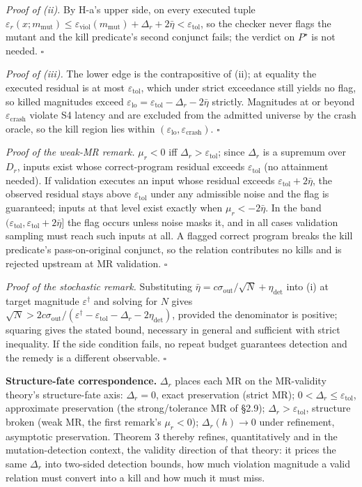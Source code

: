 \documentclass[manuscript,screen,review]{acmart}
\begin{document}
\emph{Proof of (ii).} By H-a's upper side, on every executed tuple
$\varepsilon_r(x;m_{\mathrm{mut}})\le\varepsilon_{\mathrm{viol}}(m_{\mathrm{mut}})+\Delta_r+2\bar\eta<\varepsilon_{\mathrm{tol}}$,
so the checker never flags the mutant and the kill predicate's second
conjunct fails; the verdict on $P^\star$ is not needed. $\square$

\emph{Proof of (iii).} The lower edge is the contrapositive of (ii); at
equality the executed residual is at most $\varepsilon_{\mathrm{tol}}$,
which under strict exceedance still yields no flag, so killed magnitudes
exceed $\varepsilon_{\mathrm{lo}}=\varepsilon_{\mathrm{tol}}-\Delta_r-2\bar\eta$
strictly. Magnitudes at or beyond $\varepsilon_{\mathrm{crash}}$ violate
S4 latency and are excluded from the admitted universe by the crash
oracle, so the kill region lies within
$(\varepsilon_{\mathrm{lo}},\varepsilon_{\mathrm{crash}})$. $\square$

\emph{Proof of the weak-MR remark.} $\mu_r<0$ iff
$\Delta_r>\varepsilon_{\mathrm{tol}}$; since $\Delta_r$ is a supremum
over $D_r$, inputs exist whose correct-program residual exceeds
$\varepsilon_{\mathrm{tol}}$ (no attainment needed). If validation
executes an input whose residual exceeds
$\varepsilon_{\mathrm{tol}}+2\bar\eta$, the observed residual stays
above $\varepsilon_{\mathrm{tol}}$ under any admissible noise and the
flag is guaranteed; inputs at that level exist exactly when
$\mu_r<-2\bar\eta$. In the band
$(\varepsilon_{\mathrm{tol}},\varepsilon_{\mathrm{tol}}+2\bar\eta]$ the
flag occurs unless noise masks it, and in all cases validation sampling
must reach such inputs at all. A flagged correct program breaks the kill predicate's
pass-on-original conjunct, so the relation contributes no kills and is
rejected upstream at MR validation. $\square$

\emph{Proof of the stochastic remark.} Substituting
$\bar\eta=c\sigma_{\mathrm{out}}/\sqrt N+\eta_{\mathrm{det}}$ into (i)
at target magnitude $\varepsilon^\dagger$ and solving for $N$ gives
$\sqrt N>2c\sigma_{\mathrm{out}}/(\varepsilon^\dagger-\varepsilon_{\mathrm{tol}}-\Delta_r-2\eta_{\mathrm{det}})$,
provided the denominator is positive; squaring gives the stated bound,
necessary in general and sufficient with strict inequality. If the side
condition fails, no repeat budget guarantees detection and the remedy is
a different observable. $\square$

\textbf{Structure-fate correspondence.} $\Delta_r$ places each MR on the
MR-validity theory's structure-fate axis: $\Delta_r=0$, exact
preservation (strict MR); $0<\Delta_r\le\varepsilon_{\mathrm{tol}}$,
approximate preservation (the strong/tolerance MR of §2.9);
$\Delta_r>\varepsilon_{\mathrm{tol}}$, structure broken (weak MR, the
first remark's $\mu_r<0$); $\Delta_r(h)\to0$ under refinement,
asymptotic preservation. Theorem 3 thereby refines, quantitatively and
in the mutation-detection context, the validity direction of that
theory: it prices the same $\Delta_r$ into two-sided detection bounds,
how much violation magnitude a valid relation must convert into a kill
and how much it must miss.
\end{document}
